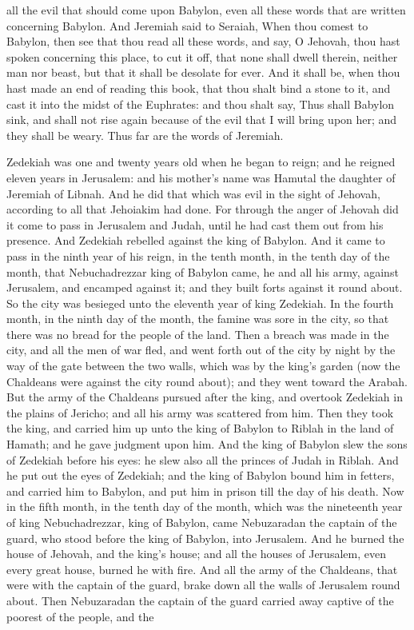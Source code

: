 all the evil that should come upon Babylon, even all these words that are written concerning Babylon. And Jeremiah said to Seraiah, When thou comest to Babylon, then see that thou read all these words, and say, O Jehovah, thou hast spoken concerning this place, to cut it off, that none shall dwell therein, neither man nor beast, but that it shall be desolate for ever. And it shall be, when thou hast made an end of reading this book, that thou shalt bind a stone to it, and cast it into the midst of the Euphrates: and thou shalt say, Thus shall Babylon sink, and shall not rise again because of the evil that I will bring upon her; and they shall be weary. Thus far are the words of Jeremiah. 

Zedekiah was one and twenty years old when he began to reign; and he reigned eleven years in Jerusalem: and his mother’s name was Hamutal the daughter of Jeremiah of Libnah. And he did that which was evil in the sight of Jehovah, according to all that Jehoiakim had done. For through the anger of Jehovah did it come to pass in Jerusalem and Judah, until he had cast them out from his presence. And Zedekiah rebelled against the king of Babylon. And it came to pass in the ninth year of his reign, in the tenth month, in the tenth day of the month, that Nebuchadrezzar king of Babylon came, he and all his army, against Jerusalem, and encamped against it; and they built forts against it round about. So the city was besieged unto the eleventh year of king Zedekiah. In the fourth month, in the ninth day of the month, the famine was sore in the city, so that there was no bread for the people of the land. Then a breach was made in the city, and all the men of war fled, and went forth out of the city by night by the way of the gate between the two walls, which was by the king’s garden (now the Chaldeans were against the city round about); and they went toward the Arabah. But the army of the Chaldeans pursued after the king, and overtook Zedekiah in the plains of Jericho; and all his army was scattered from him. Then they took the king, and carried him up unto the king of Babylon to Riblah in the land of Hamath; and he gave judgment upon him. And the king of Babylon slew the sons of Zedekiah before his eyes: he slew also all the princes of Judah in Riblah. And he put out the eyes of Zedekiah; and the king of Babylon bound him in fetters, and carried him to Babylon, and put him in prison till the day of his death.  Now in the fifth month, in the tenth day of the month, which was the nineteenth year of king Nebuchadrezzar, king of Babylon, came Nebuzaradan the captain of the guard, who stood before the king of Babylon, into Jerusalem. And he burned the house of Jehovah, and the king’s house; and all the houses of Jerusalem, even every great house, burned he with fire. And all the army of the Chaldeans, that were with the captain of the guard, brake down all the walls of Jerusalem round about. Then Nebuzaradan the captain of the guard carried away captive of the poorest of the people, and the 